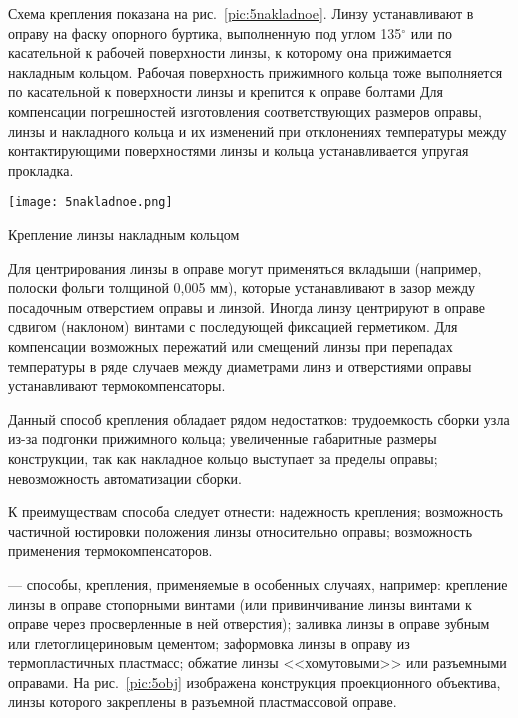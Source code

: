Схема крепления показана на рис.~\ref{pic:5nakladnoe}. 
Линзу устанавливают в оправу на фаску опорного буртика, выполненную под углом 135$^\circ$ или по касательной к рабочей поверхности линзы, к которому она прижимается накладным кольцом. 
Рабочая поверхность прижимного кольца тоже выполняется по касательной к поверхности линзы и крепится к оправе болтами Для компенсации погрешностей изготовления соответствующих размеров оправы, линзы и накладного кольца и их изменений при отклонениях температуры между контактирующими поверхностями линзы и кольца устанавливается упругая прокладка.

\begin{marginfigure}
	\begin{center}
		\texttt{[image: 5nakladnoe.png]}
		\caption{Крепление линзы накладным кольцом}
		\label{pic:5nakladnoe}
	\end{center}
\end{marginfigure}

Для центрирования линзы в оправе могут применяться вкладыши (например, полоски фольги толщиной 0,005 мм), которые устанавливают в зазор между посадочным отверстием оправы и линзой. 
Иногда линзу центрируют в оправе сдвигом (наклоном) винтами с последующей фиксацией герметиком.
Для компенсации возможных пережатий или смещений линзы при перепадах температуры в ряде случаев между диаметрами линз и отверстиями оправы устанавливают термокомпенсаторы.

Данный способ крепления обладает рядом недостатков: трудоемкость сборки узла из-за подгонки прижимного кольца; увеличенные габаритные размеры конструкции, так как накладное кольцо выступает за пределы оправы; невозможность автоматизации сборки.

К преимуществам способа следует отнести: надежность крепления; возможность частичной юстировки положения линзы относительно оправы; возможность применения термокомпенсаторов.

  --- способы, крепления, применяемые в особенных случаях, например: крепление линзы в оправе стопорными винтами (или привинчивание линзы винтами к оправе через просверленные в ней отверстия); заливка линзы в оправе зубным или глетоглицериновым цементом; заформовка линзы в оправу из термопластичных пластмасс; обжатие линзы <<хомутовыми>> или разъемными оправами. 
На рис.~\ref{pic:5obj} изображена конструкция проекционного объектива, линзы которого закреплены в разъемной пластмассовой оправе.

